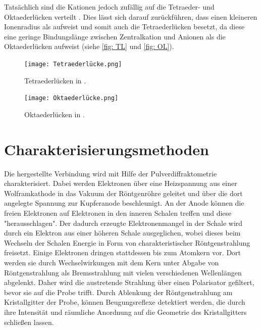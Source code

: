 \documentclass[a4paper,12pt,bibliography=totocnumbered]{scrartcl}
\begin{document}
Tatsächlich sind die Kationen jedoch zufällig auf die Tetraeder- und Oktaederlücken verteilt \cite{Rieck}.
Dies lässt sich darauf zurückführen, dass  einen kleineren Ionenradius als  aufweist und somit auch die Tetraederlücken besetzt, da diese eine geringe Bindungslänge zwischen Zentralkation und Anionen als die Oktaederlücken aufweist (siehe \autoref{fig: TL} und \autoref{fig: OL}).


\begin{figure}[H]
    \centering
    \texttt{[image: Tetraederlücke.png]}
    \caption{Tetraederlücken in .\cite{Rieck}}
    \label{fig: TL}
\end{figure}

\begin{figure}[H]
    \centering
    \texttt{[image: Oktaederlücke.png]}
    \caption{Oktaederlücken in .\cite{Rieck}}
    \label{fig: OL}
\end{figure}



\cite{Müller}

\section{Charakterisierungsmethoden}
Die hergestellte Verbindung wird mit Hilfe der Pulverdiffraktometrie charakterisiert.
Dabei werden Elektronen über eine Heizspannung aus einer Wolframkathode in das Vakuum der Röntgenröhre geleitet und über die dort angelegte Spannung zur Kupferanode beschleunigt. 
An der Anode können die freien Elektronen auf Elektronen in den inneren Schalen treffen und diese "herausschlagen".
Der dadurch erzeugte Elektronenmangel in der Schale wird durch ein Elektron aus einer höheren Schale ausgeglichen, wobei dieses beim Wechseln der Schalen Energie in Form von charakteristischer Röntgenstrahlung freisetzt. 
Einige Elektronen dringen stattdessen bis zum Atomkern vor. 
Dort werden sie durch Wechselwirkungen mit dem Kern unter Abgabe von Röntgenstrahlung als Bremsstrahlung mit vielen verschiedenen Wellenlängen abgelenkt.
Daher wird die austretende Strahlung über einen Polarisator gefiltert, bevor sie auf die Probe trifft. 
Durch Ablenkung der Röntgenstrahlung am Kristallgitter der Probe, können Beugungsreflexe detektiert werden, die durch ihre Intensität und räumliche Anordnung auf die Geometrie des Kristallgitters schließen lassen.

\newpage
\end{document}

